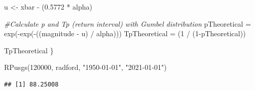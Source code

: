 \documentclass[
]{book}
\newenvironment{Shaded}{\begin{snugshade}}{\end{snugshade}}
\newcommand{\CommentTok}[1]{\textcolor[rgb]{0.56,0.35,0.01}{\textit{#1}}}
\newcommand{\DecValTok}[1]{\textcolor[rgb]{0.00,0.00,0.81}{#1}}
\newcommand{\FloatTok}[1]{\textcolor[rgb]{0.00,0.00,0.81}{#1}}
\newcommand{\FunctionTok}[1]{\textcolor[rgb]{0.00,0.00,0.00}{#1}}
\newcommand{\NormalTok}[1]{#1}
\newcommand{\OtherTok}[1]{\textcolor[rgb]{0.56,0.35,0.01}{#1}}
\newcommand{\SpecialCharTok}[1]{\textcolor[rgb]{0.00,0.00,0.00}{#1}}
\newcommand{\StringTok}[1]{\textcolor[rgb]{0.31,0.60,0.02}{#1}}
\begin{document}
\begin{Shaded}
\begin{Highlighting}[]
\NormalTok{  u }\OtherTok{\textless{}{-}}\NormalTok{ xbar }\SpecialCharTok{{-}}\NormalTok{ (}\FloatTok{0.5772} \SpecialCharTok{*}\NormalTok{ alpha)}
  
  \CommentTok{\#Calculate p and Tp (return interval) with Gumbel distribution}
\NormalTok{  pTheoretical }\OtherTok{=} \FunctionTok{exp}\NormalTok{(}\SpecialCharTok{{-}}\FunctionTok{exp}\NormalTok{(}\SpecialCharTok{{-}}\NormalTok{((magnitude }\SpecialCharTok{{-}}\NormalTok{ u) }\SpecialCharTok{/}\NormalTok{ alpha)))}
\NormalTok{  TpTheoretical }\OtherTok{=}\NormalTok{ (}\DecValTok{1} \SpecialCharTok{/}\NormalTok{ (}\DecValTok{1}\SpecialCharTok{{-}}\NormalTok{pTheoretical))}
  
\NormalTok{  TpTheoretical}
\NormalTok{\}}

\FunctionTok{RPusgs}\NormalTok{(}\DecValTok{120000}\NormalTok{, radford, }\StringTok{"1950{-}01{-}01"}\NormalTok{, }\StringTok{"2021{-}01{-}01"}\NormalTok{)}
\end{Highlighting}
\end{Shaded}

\begin{verbatim}
## [1] 88.25008
\end{verbatim}

  
\end{document}
